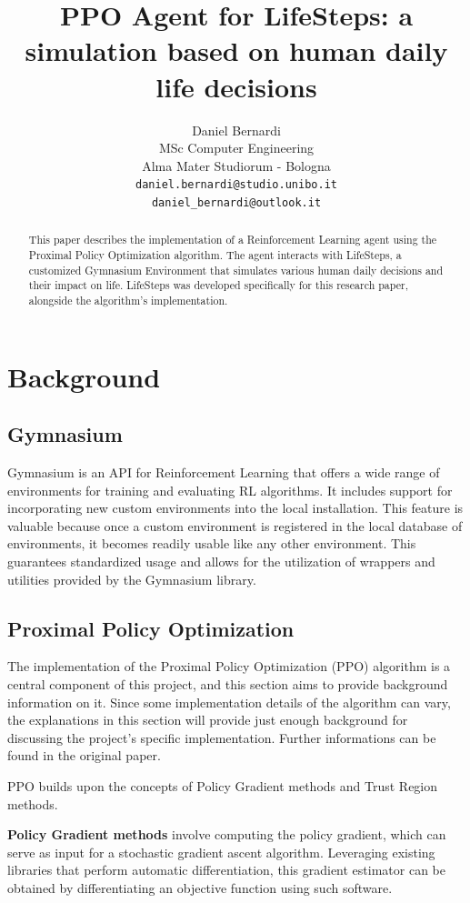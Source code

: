 \documentclass{article}
\title{PPO Agent for LifeSteps: a simulation based on human daily life decisions}
\author{%
  Daniel Bernardi\\
  MSc Computer Engineering\\
  Alma Mater Studiorum - Bologna\\
  \texttt{daniel.bernardi@studio.unibo.it} \\
  \texttt{daniel\_bernardi@outlook.it}
}
\begin{document}
\maketitle

\begin{abstract}
This paper describes the implementation of a Reinforcement Learning agent using the Proximal Policy Optimization algorithm. The agent interacts with LifeSteps, a customized Gymnasium Environment that simulates various human daily decisions and their impact on life. LifeSteps was developed specifically for this research paper, alongside the algorithm's implementation.
\end{abstract}

\section{Background}

\subsection{Gymnasium}
Gymnasium is an API for Reinforcement Learning that offers a wide range of environments for training and evaluating RL algorithms. It includes support for incorporating new custom environments into the local installation. This feature is valuable because once a custom environment is registered in the local database of environments, it becomes readily usable like any other environment. This guarantees standardized usage and allows for the utilization of wrappers and utilities provided by the Gymnasium library.

\subsection{Proximal Policy Optimization}
The implementation of the Proximal Policy Optimization (PPO) algorithm is a central component of this project, and this section aims to provide background information on it. Since some implementation details of the algorithm can vary, the explanations in this section will provide just enough background for discussing the project's specific implementation. Further informations can be found in the original paper.

PPO builds upon the concepts of Policy Gradient methods and Trust Region methods. 

\textbf{Policy Gradient methods} involve computing the policy gradient, which can serve as input for a stochastic gradient ascent algorithm. Leveraging existing libraries that perform automatic differentiation, this gradient estimator can be obtained by differentiating an objective function using such software.
\end{document}
